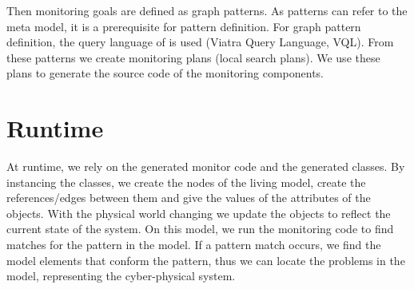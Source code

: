 Then monitoring goals are defined as graph patterns. 
As patterns can refer to the meta model, it is a prerequisite for pattern definition. 
For graph pattern definition, the query language of \viatra{} is used (Viatra Query Language, VQL). 
From these patterns we create monitoring plans (local search plans). 
We use these plans to generate the source code of the monitoring components.

\section{Runtime}

At runtime, we rely on the generated monitor code and the generated classes. 
By instancing the classes, we create the nodes of the living model, create the references/edges between them and give the values of the attributes of the objects. 
With the physical world changing we update the objects to reflect the current state of the system. 
On this model, we run the monitoring code to find matches for the pattern in the model. 
If a pattern match occurs, we find the model elements that conform the pattern, thus we can locate the problems in the model, representing the cyber-physical system.
